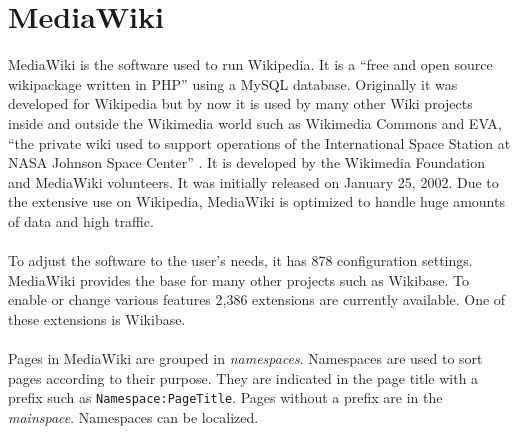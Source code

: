 \section{MediaWiki}

MediaWiki is the software used to run Wikipedia. It is a ``free and open source wikipackage written in PHP'' \citep{wiki:13} using a MySQL database. Originally it was developed for Wikipedia but by now it is used by many other Wiki projects inside and outside the Wikimedia world such as Wikimedia Commons and EVA, ``the private wiki used to support operations of the International Space Station at NASA Johnson Space Center'' \citep{eva-nasa}. It is developed by the Wikimedia Foundation and MediaWiki volunteers. It was initially released on January 25, 2002. \citep{wiki:13} Due to the extensive use on Wikipedia, MediaWiki is optimized to handle huge amounts of data and high traffic. \citep{wiki:14} \\
\\
To adjust the software to the user's needs, it has 878 configuration settings. \citep{wiki:15} \\
MediaWiki provides the base for many other projects such as Wikibase. To enable or change various features 2,386 extensions are currently available. \citep{wiki:16} One of these extensions is Wikibase. \\
\\
Pages in MediaWiki are grouped in \textit{namespaces}. Namespaces are used to sort pages according to their purpose. They are indicated in the page title with a prefix such as \texttt{\justify Namespace:PageTitle}. Pages without a prefix are in the \textit{mainspace}. Namespaces can be localized. \citep{wiki:17}